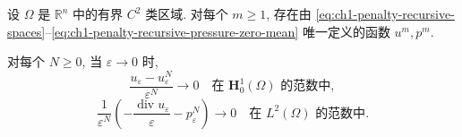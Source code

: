 \begin{Theorem}
\label{thm:ch1-penalty-asymptotic-expansion}
设 $\Omega$ 是 $\mathbb R^n$ 中的有界 $C^2$ 类区域. 对每个 $m\geq1$, 存在由 \eqref{eq:ch1-penalty-recursive-spaces}--\eqref{eq:ch1-penalty-recursive-pressure-zero-mean} 唯一定义的函数 $u^m,p^m$.

对每个 $N\geq0$, 当 $\varepsilon\to0$ 时,
\begin{equation}
\frac{u_\varepsilon-u_\varepsilon^N}{\varepsilon^N}
\longrightarrow0
\quad\text{在 }\mathbf H_0^1(\Omega)\text{ 的范数中},
\label{eq:ch1-penalty-velocity-remainder}
\end{equation}
\begin{equation}
\frac{1}{\varepsilon^N}
\left(-\frac{\operatorname{div}u_\varepsilon}{\varepsilon}
-p_\varepsilon^N\right)
\longrightarrow0
\quad\text{在 }L^2(\Omega)\text{ 的范数中}.
\label{eq:ch1-penalty-pressure-remainder}
\end{equation}
\end{Theorem}

